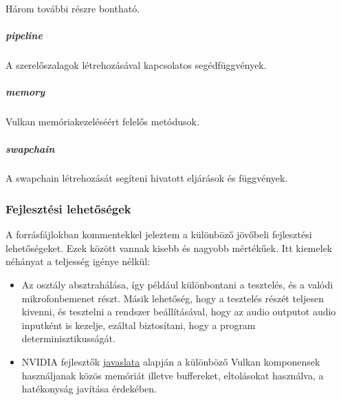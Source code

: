 H\'arom tov\'abbi r\'eszre bonthat\'o.
\subparagraph{pipeline}
A szerel\H oszalagok l\'etrehoz\'as\'aval kapcsolatos seg\'edf\"uggv\'enyek.

\subparagraph{memory}
Vulkan mem\'oriakezel\'es\'e\'ert felel\H os met\'odusok.

\subparagraph{swapchain}
A swapchain l\'etrehoz\'as\'at seg\'iteni hivatott elj\'ar\'asok \'es f\"uggv\'enyek.

\subsubsection{Fejleszt\'esi lehet\H os\'egek}
A forr\'asf\'ajlokban  kommentekkel jeleztem a k\"ul\"onb\"oz\H o j\"ov\H obeli fejleszt\'esi lehet\H os\'egeket. Ezek k\"oz\"ott vannak kisebb \'es nagyobb m\'ert\'ek\H uek. 
Itt kiemelek n\'eh\'anyat a teljess\'eg ig\'enye n\'elk\"ul:
\begin{itemize}
	\item Az  oszt\'aly absztrah\'al\'asa, \'igy p\'eld\'aul k\"ul\"onbontani a tesztel\'es, \'es a val\'odi mikrofonbemenet r\'eszt. \newline
	M\'asik lehet\H os\'eg, hogy a tesztel\'es r\'esz\'et teljesen kivenni, \'es tesztelni a rendszer be\'all\'it\'as\'aval, hogy az audio outputot audio inputk\'ent is kezelje, ez\'altal biztos\'itani, hogy a program determinisztikuss\'ag\'at.
	\item NVIDIA fejleszt\H ok \href{https://developer.nvidia.com/vulkan-memory-management}{javaslata} alapj\'an a k\"ul\"onb\"oz\H o Vulkan komponensek haszn\'aljanak k\"oz\"os mem\'ori\'at illetve buffereket, eltol\'asokat haszn\'alva, a hat\'ekonys\'ag jav\'it\'asa \'erdek\'eben.
\end{itemize}
